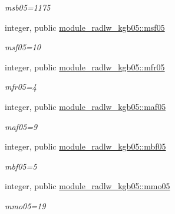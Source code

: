 \begin{DoxyCompactItemize}
\begin{DoxyCompactList}\small\item\em msb05=1175 \end{DoxyCompactList}\item 
\mbox{\label{group__module__radlw__kgbnn_ga1c9a43b7011e7328fa62d3ecd29acc73}} 
integer, public \hyperlink{group__module__radlw__kgbnn_ga1c9a43b7011e7328fa62d3ecd29acc73}{module\+\_\+radlw\+\_\+kgb05\+::msf05}
\begin{DoxyCompactList}\small\item\em msf05=10 \end{DoxyCompactList}\item 
\mbox{\label{group__module__radlw__kgbnn_ga44f07da9a7f99377f7d331249c475b80}} 
integer, public \hyperlink{group__module__radlw__kgbnn_ga44f07da9a7f99377f7d331249c475b80}{module\+\_\+radlw\+\_\+kgb05\+::mfr05}
\begin{DoxyCompactList}\small\item\em mfr05=4 \end{DoxyCompactList}\item 
\mbox{\label{group__module__radlw__kgbnn_gaba904215976d7f4316b52c8f0cffe595}} 
integer, public \hyperlink{group__module__radlw__kgbnn_gaba904215976d7f4316b52c8f0cffe595}{module\+\_\+radlw\+\_\+kgb05\+::maf05}
\begin{DoxyCompactList}\small\item\em maf05=9 \end{DoxyCompactList}\item 
\mbox{\label{group__module__radlw__kgbnn_ga57db9a9cb9acac604df555038f6127a3}} 
integer, public \hyperlink{group__module__radlw__kgbnn_ga57db9a9cb9acac604df555038f6127a3}{module\+\_\+radlw\+\_\+kgb05\+::mbf05}
\begin{DoxyCompactList}\small\item\em mbf05=5 \end{DoxyCompactList}\item 
\mbox{\label{group__module__radlw__kgbnn_gaa552aae4878030144218ca6c2bbe417f}} 
integer, public \hyperlink{group__module__radlw__kgbnn_gaa552aae4878030144218ca6c2bbe417f}{module\+\_\+radlw\+\_\+kgb05\+::mmo05}
\begin{DoxyCompactList}\small\item\em mmo05=19 \end{DoxyCompactList}\item 

\end{DoxyCompactItemize}
